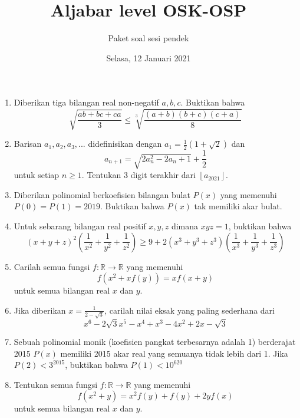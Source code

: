 \documentclass[12pt]{scrartcl}
\title{Aljabar level OSK-OSP}
\author{Paket soal sesi pendek}
\date{Selasa, 12 Januari 2021}
\begin{document}
	\maketitle

\renewcommand*\contentsname{Daftar Isi}
\tableofcontents

\newpage
	\begin{enumerate}
		\item
		
		Diberikan tiga bilangan real non-negatif $a,b,c$. Buktikan bahwa
		$$\sqrt{\dfrac{ab+bc+ca}{3}} \le \sqrt[3]{\dfrac{(a+b)(b+c)(c+a)}{8}}$$
		
		\item
		Barisan $a_1,a_2,a_3,...$ didefinisikan dengan $a_1=\frac12 (1+\sqrt{2})$ dan $$a_{n+1}=\sqrt{2a_n^2-2a_n+1}+\frac12$$ untuk setiap $n \ge 1$. Tentukan 3 digit terakhir dari $\left \lfloor{a_{2021}}\right \rfloor$.
		
		\item
		Diberikan polinomial berkoefisien bilangan bulat $P(x)$ yang memenuhi $P(0)=P(1)=2019$. Buktikan bahwa $P(x)$ tak memiliki akar bulat.
		
		\item
		Untuk sebarang bilangan real positif $x,y,z$ dimana $xyz=1$, buktikan bahwa $$(x+y+z)^2\left (\dfrac{1}{x^2}+\dfrac{1}{y^2}+\dfrac{1}{z^2}\right) \ge 9 + 2(x^3+y^3+z^3)\left (\dfrac{1}{x^3}+\dfrac{1}{y^3}+\dfrac{1}{z^3}\right) $$
		
		\item
		Carilah semua fungsi $f:\mathbb{R} \rightarrow \mathbb{R}$ yang memenuhi $$f(x^2+xf(y))=xf(x+y)$$ untuk semua bilangan real $x$ dan $y$.
		
		\item
		Jika diberikan $x=\frac{1}{2-\sqrt3}$, carilah nilai eksak yang paling sederhana dari $$x^6-2\sqrt3x^5-x^4+x^3-4x^2+2x-\sqrt3$$
		
		\item
		Sebuah polinomial monik (koefisien pangkat terbesarnya adalah 1) berderajat 2015 $P(x)$ memiliki 2015 akar real yang semuanya tidak lebih dari 1. Jika $P(2)<3^{2015}$, buktikan bahwa $P(1)<10^{620}$
		
		\item
		Tentukan semua fungsi $f:\mathbb{R} \rightarrow \mathbb{R}$ yang memenuhi $$f(x^2+y)=x^2f(y)+f(y)+2yf(x)$$ untuk semua bilangan real $x$ dan $y$.
		 
	\end{enumerate}
\end{document}
